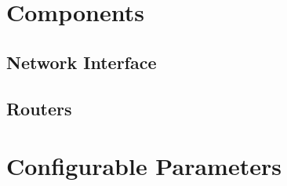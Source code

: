 \section{Components}
\subsection{Network Interface}
\subsection{Routers}

\section{Configurable Parameters}
